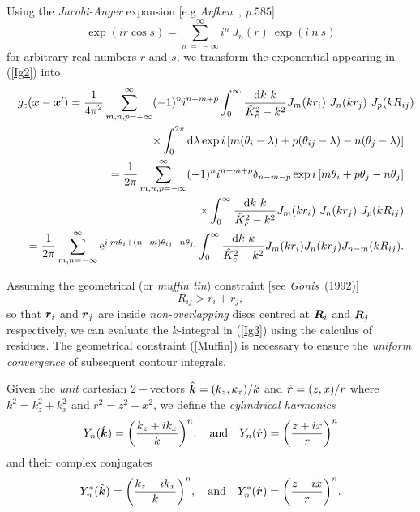 Using the {\em Jacobi-Anger\/}  expansion [e.g {\em 
Arfken}~, {\em p.}$585$]
\begin{equation} \label{JacobiAnger}
\exp(i r \cos s)=\sum\limits_{ n\ =\ -\infty }^{ \infty } { i}^{ n} \
{J}_{n}(r)\ \exp \left({i\ n\ s}\right)
\end{equation} for arbitrary real numbers $r$ and $s$, we transform the
exponential appearing in (\ref{Ig2}) into
\begin{eqnarray} \label{Ig3} 
\lefteqn{{g}_{c }({\bmi  x} -{\bmi  x}^{\prime} )=\frac{1}{{4 \pi }^{2}}
\sum\limits_{ m,n,p = -\infty }^{ \infty } (-1)^{n}{ i}^{ n+m+p}
\int_{0}^{\infty}  
\frac{{{\rm d}}{ k}\  k}{{\hat{ K}_{c }^{2}-{k}^{2}}} {J}_{m}(k r_i) \ {J}_{n}(k
r_{j})\ {J}_{p}(k  R_{ij})
}\nonumber\\  
&&\times \int_{0}^{2 \pi}{{\rm d}}{\lambda} \exp i  \left[
m(\theta_i-\lambda) + p (\theta_{ij}-\lambda ) -n(\theta_j-\lambda)
\right]\nonumber\\
&&={\frac{1}{2{ \pi }}}
\sum\limits_{ m,n,p = -\infty }^{ \infty } (-1)^{n}{ i}^{ n+m+p}
\delta_{n-m-p}   \exp i  \left[ m \theta_i + p \theta_{j} -n\theta_j 
\right]
\nonumber\\  
&&\times \int_{0}^{\infty}  
\frac{{{\rm d}}{ k}\  k}{{\hat{ K}_{c }^{2}-{k}^{2}}} {J}_{m}(k r_i) \ {J}_{n}(k
r_j)\ {J}_{p}(k  R_{ij})\nonumber\\
&&={\frac{1}{2{ \pi }}}
\sum\limits_{ m,n = -\infty }^{ \infty }  {\rm e}^{ i  \left[ m \theta_i + 
(n-m)
\theta_{ij} -n\theta_j \right]}\int_{0}^{\infty}  
\frac{{{\rm d}}{ k}\  k}{{\hat{ K}_{c }^{2}-{k}^{2}}} {J}_{m}(k r_i)  {J}_{n}(k
r_j) {J}_{n-m}(k  R_{ij}).
\end{eqnarray}


Assuming the geometrical (or {\em muffin tin\/}) constraint [see {\em 
Gonis\/}~(1992)]  
\begin{equation} \label{Muffin}
 R_{ij} > r_{i} + r_{j},
\end{equation}  
so that ${\mbox{\boldmath$\mit r$\unboldmath}}_{i}$ and ${\mbox{\boldmath$\mit r$\unboldmath}}_{j}$ are inside {\em non-overlapping\/} discs 
centred at ${\mbox{\boldmath$\mit R$\unboldmath}}_{i}$ and ${\mbox{\boldmath$\mit R$\unboldmath}}_{j}$ respectively,
we can evaluate the $k$-integral in (\ref{Ig3}) using the calculus of residues.
 The geometrical constraint 
(\ref{Muffin})
 is necessary to ensure the {\em uniform convergence\/} 
of subsequent contour integrals.

Given the {\em unit \/} cartesian $2-$vectors $\hat{\mbox{\boldmath$\mit k$\unboldmath}}=({k}_{z},{k}_{x})/k$ and 
$\hat{\mbox{\boldmath$\mit r$\unboldmath}}=({z},{x})/r$
where $k^{2}={k}_{z}^{2}+{k}_{x}^{2}$ and $r^{2}={z}^{2}+{x}^{2}$, 
we define the {\em cylindrical harmonics\/}
\begin{equation} \label{Ydef}
{Y}_{n}(\hat{\mbox{\boldmath$\mit k$\unboldmath}})={\left({{\frac{{k}_{z}+i{k}_{x}}{k}}}\right)}^{n}, 
\quad \mbox{and} \quad 
{Y}_{n}(\hat{\mbox{\boldmath$\mit r$\unboldmath}})={\left({{\frac{{z}+i{x}}{r}}}\right)}^{n}
\end{equation}
and their complex conjugates
\begin{equation} \label{Ycdef}
{Y}_{n}^{\ast}(\hat{\mbox{\boldmath$\mit k$\unboldmath}})={\left({{\frac{{k}_{z}-i{k}_{x}}{k}}}\right)}^{n}, 
\quad \mbox{and} \quad 
{Y}_{n}^{\ast}(\hat{\mbox{\boldmath$\mit r$\unboldmath}})={\left({{\frac{{z}-i{x}}{r}}}\right)}^{n}.
\end{equation}

